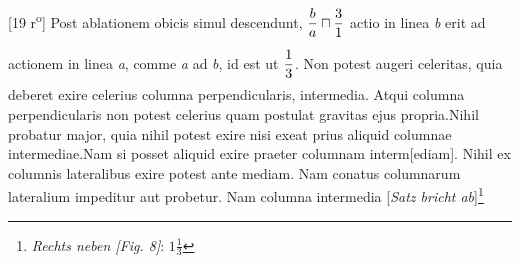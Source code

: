                 \vspace*{8mm}
                \pstart 
                \normalsize
            [19 r\textsuperscript{o}] Post ablationem obicis  simul descendunt, 
            $\displaystyle \frac{b}{a}\sqcap \frac{3}{1}\rule[-4mm]{0mm}{10mm} $
             actio in linea \textit{b} erit ad actionem in linea \textit{a},  comme \textit{a} ad \textit{b}, id est ut $\displaystyle \frac{1}{3}\rule[-4mm]{0mm}{10mm} $. Non potest augeri celeritas, quia deberet exire celerius columna perpendicularis,  intermedia. Atqui columna perpendicularis non potest celerius  quam postulat gravitas ejus propria.\pend \pstart  Nihil probatur major, quia nihil potest exire nisi exeat  prius aliquid columnae intermediae.\pend \pstart  Nam si posset aliquid exire praeter columnam interm[ediam].  Nihil ex columnis lateralibus exire potest ante mediam.  Nam conatus columnarum lateralium impeditur aut  probetur. Nam columna intermedia  [\textit{Satz bricht ab}]\footnote{\textit{Rechts neben [Fig. 8]}:  $\displaystyle 1\frac{1}{3}$}  \pend
                      
